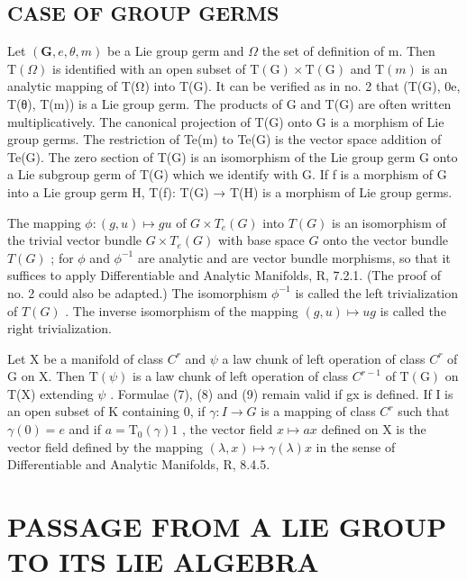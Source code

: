 \subsection{CASE OF GROUP GERMS}

Let \((\mathbf{G}, e, \theta, m)\) be a Lie group germ and \(\Omega\) the set of definition of m. Then \(\mathrm{T}(\Omega)\) is identified with an open subset of \(\mathrm{T}(\mathrm{G}) \times \mathrm{T}(\mathrm{G})\) and \(\mathrm{T}(m)\) is an analytic mapping of T(Ω) into T(G). It can be verified as in no. 2 that (T(G), 0e, T(θ), T(m)) is a Lie group germ. The products of G and T(G) are often written multiplicatively. The canonical projection of T(G) onto G is a morphism of Lie group germs. The restriction of Te(m) to Te(G) is the vector space addition of Te(G). The zero section of T(G) is an isomorphism of the Lie group germ G onto a Lie subgroup germ of T(G) which we identify with G. If f is a morphism of G into a Lie group germ H, T(f): T(G) → T(H) is a morphism of Lie group germs.

The mapping \(\phi\colon(g,u)\mapsto gu\) of \(G\times T_{e}(G)\) into \(T(G)\) is an isomorphism of the trivial vector bundle \(G\times T_{e}(G)\) with base space \(G\) onto the vector bundle \(T(G)\) ; for \(\phi\) and \(\phi^{-1}\) are analytic and are vector bundle morphisms, so that it suffices to apply Differentiable and Analytic Manifolds, R, 7.2.1. (The proof of no. 2 could also be adapted.) The isomorphism \(\phi^{-1}\) is called the left trivialization of \(T(G)\) . The inverse isomorphism of the mapping \((g,u)\mapsto ug\) is called the right trivialization.

Let X be a manifold of class \(C^{r}\) and \(\psi\) a law chunk of left operation of class \(C^{r}\) of G on X. Then \(\mathrm{T}(\psi)\) is a law chunk of left operation of class \(C^{r-1}\) of \(\mathrm{T}(\mathrm{G})\) on T(X) extending \(\psi\) . Formulae (7), (8) and (9) remain valid if gx is defined. If I is an open subset of K containing 0, if \(\gamma: I \to G\) is a mapping of class \(C^{r}\) such that \(\gamma(0) = e\) and if \(a = \mathrm{T}_{0}(\gamma)1\) , the vector field \(x \mapsto ax\) defined on X is the vector field defined by the mapping \((\lambda, x) \mapsto \gamma(\lambda)x\) in the sense of Differentiable and Analytic Manifolds, R, 8.4.5.

\section{PASSAGE FROM A LIE GROUP TO ITS LIE ALGEBRA}

